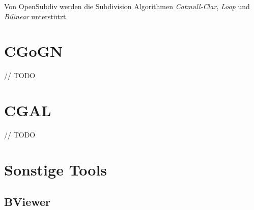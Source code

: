 Von OpenSubdiv werden die Subdivision Algorithmen \emph{Catmull-Clar}, \emph{Loop} und \emph{Bilinear} unterstützt. \cite{Pixar.27.07.2015}

\section{CGoGN}

// TODO
\cite{ieee:wpan}

\section{\acf{CGAL}}

// TODO


\section{Sonstige Tools}


\subsection{BViewer}

